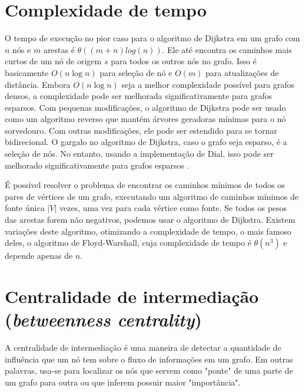 \section{Complexidade de tempo}
O tempo de execução no pior caso para o algoritmo de Dijkstra em um grafo com $n$ nós e $m$ arestas é $\theta((m + n)log(n))$. Ele até encontra os caminhos mais curtos de um nó de origem $s$ para todos os outros nós no grafo. Isso é basicamente $O(n\log{}n)$ para seleção de nó e $O(m)$ para atualizações de distância. Embora $O(n\log{}n)$ seja a melhor complexidade possível para grafos densos, a complexidade pode ser melhorada significativamente para grafos esparsos. Com pequenas modificações, o algoritmo de Dijkstra pode ser usado como um algoritmo reverso que mantém árvores geradoras mínimas para o nó sorvedouro. Com outras modificações, ele pode ser estendido para se tornar bidirecional. O gargalo no algoritmo de Dijkstra, caso o grafo seja esparso, é a seleção de nós. No entanto, usando a implementação de Dial, isso pode ser melhorado significativamente para grafos esparsos \cite{len2021}.

É possível resolver o problema de encontrar os caminhos mínimos de todos os pares de vértices de um grafo, executando um algoritmo de caminhos mínimos de fonte única $|V|$ vezes, uma vez para cada vértice como fonte. Se todos os pesos das arestas forem não negativos, podemos usar o algoritmo de Dijkstra. Existem variações deste algoritmo, otimizando a complexidade de tempo, o mais famoso deles, o algoritmo de Floyd-Warshall, cuja complexidade de tempo é $\theta(n^3)$ e depende apenas de $n$.

\section{Centralidade de intermediação (\emph{betweenness centrality})}
A centralidade de intermediação é uma maneira de detectar a quantidade de influência que um nó tem sobre o fluxo de informações em um grafo. Em outras palavras, usa-se para localizar os nós que servem como "ponte" de uma parte de um grafo para outra ou que inferem possuir maior "importância".

